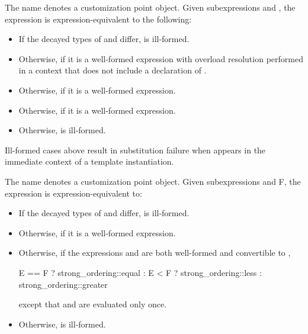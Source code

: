 %
\pnum
The name  denotes
a customization point object.
Given subexpressions  and ,
the expression 
is expression-equivalent to the following:
\begin{itemize}
\item
  If the decayed types of  and  differ,
   is ill-formed.
\item
  Otherwise, 
  if it is a well-formed expression
  with overload resolution performed in a context
  that does not include a declaration of .
\item
  Otherwise, 
  if it is a well-formed expression.
\item
  Otherwise, 
  if it is a well-formed expression.
\item
  Otherwise,  is ill-formed.
\end{itemize}

\begin{note}
Ill-formed cases above result in substitution failure
when  appears in the immediate context
of a template instantiation.
\end{note}

%
\pnum
The name 
denotes a customization point object.
Given subexpressions  and {F},
the expression 
is expression-equivalent to:
\begin{itemize}
\item
  If the decayed types of  and  differ,
   is ill-formed.
\item
  Otherwise,  if it is a well-formed expression.
\item
  Otherwise, if the expressions  and 
  are both well-formed and convertible to ,
\begin{codeblock}
E == F ? strong_ordering::equal :
E < F  ? strong_ordering::less :
         strong_ordering::greater
\end{codeblock}
except that  and  are evaluated only once.
\item
Otherwise,  is ill-formed.
\end{itemize}

